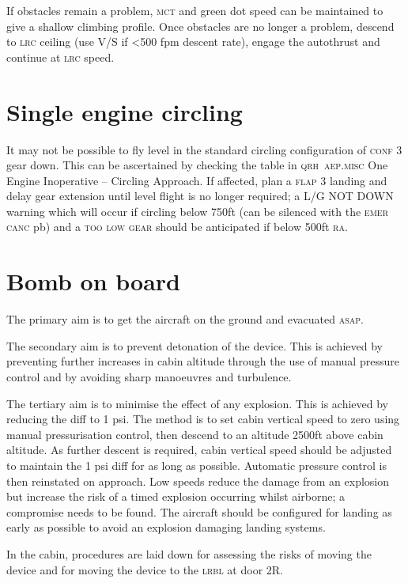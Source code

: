 \documentclass[a5paper,11pt,twoside]{book}
\newcommand{\ac}[1]{{\scshape\MakeLowercase{#1}}}
\newcommand{\inlcite}[1]{{\ac{#1}}}
\newcommand{\multicite}[1]{%
  \nopagebreak
  \noindent{{\color{blue}\footnotesize[\inlcite{#1}]}}
}
\begin{document}
If obstacles remain a problem, \ac{MCT} and green dot speed can be maintained to
give a shallow climbing profile. Once obstacles are no longer a problem, descend
to \ac{LRC} ceiling (use V/S if <500 fpm descent rate), engage the autothrust
and continue at \ac{LRC} speed.

\multicite{FCTM~PRO.AEP.ENG.EFDC}
\section{Single engine circling}

It may not be possible to fly level in the standard circling configuration of
\ac{CONF} 3 gear down. This can be ascertained by checking the table in
\inlcite{QRH~AEP.MISC} One Engine Inoperative – Circling Approach. If affected,
plan a \ac{FLAP} 3 landing and delay gear extension until level flight is no
longer required; a L/G NOT DOWN warning which will occur if circling below 750ft
(can be silenced with the \ac{EMER CANC} pb) and a \ac{TOO LOW GEAR} should be
anticipated if below 500ft \ac{RA}.

\multicite{QRH~AEP.MISC}

\section{Bomb on board}

The primary aim is to get the aircraft on the ground and evacuated \ac{ASAP}.

The secondary aim is to prevent detonation of the device. This is achieved by
preventing further increases in cabin altitude through the use of manual
pressure control and by avoiding sharp manoeuvres and turbulence.

The tertiary aim is to minimise the effect of any explosion. This is achieved by
reducing the diff to 1 psi. The method is to set cabin vertical speed to zero
using manual pressurisation control, then descend to an altitude 2500ft above
cabin altitude. As further descent is required, cabin vertical speed should be
adjusted to maintain the 1 psi diff for as long as possible. Automatic pressure
control is then reinstated on approach. Low speeds reduce the damage from an
explosion but increase the risk of a timed explosion occurring whilst airborne;
a compromise needs to be found. The aircraft should be configured for landing as
early as possible to avoid an explosion damaging landing systems.

In the cabin, procedures are laid down for assessing the risks of moving the
device and for moving the device to the \ac{LRBL} at door 2R.
\end{document}
